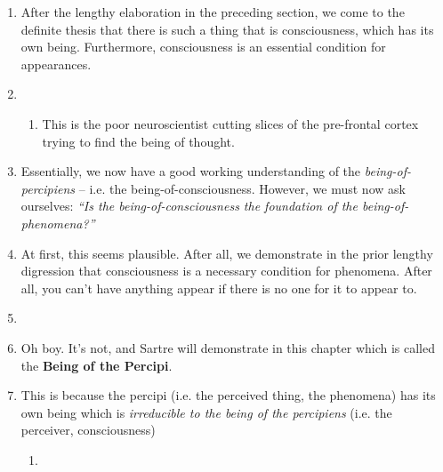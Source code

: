 \begin{enumerate}
  \item After the lengthy elaboration in the preceding section, we come to the definite thesis that there is such a thing that is consciousness, which has its own being. Furthermore, consciousness is an essential condition for appearances.
  \item {}
  \begin{enumerate}
    \item This is the poor neuroscientist cutting slices of the pre-frontal cortex trying to find the being of thought.
  \end{enumerate}
  \item Essentially, we now have a good working understanding of the \emph{being-of-percipiens} -- i.e. the being-of-consciousness. However, we must now ask ourselves: \emph{\enquote{Is the being-of-consciousness the foundation of the being-of-phenomena?}}
  \item At first, this seems plausible. After all, we demonstrate in the prior lengthy digression that consciousness is a necessary condition for phenomena. After all, you can't have anything appear if there is no one for it to appear to.
  \item {}
  \item Oh boy. It's not, and Sartre will demonstrate in this chapter which is called the \textbf{Being of the Percipi}.
  \item This is because the percipi (i.e. the perceived thing, the phenomena) has its own being which is \emph{irreducible to the being of the percipiens} (i.e. the perceiver, consciousness)
  \begin{enumerate}
    \item {}
  \end{enumerate}
\end{enumerate}

